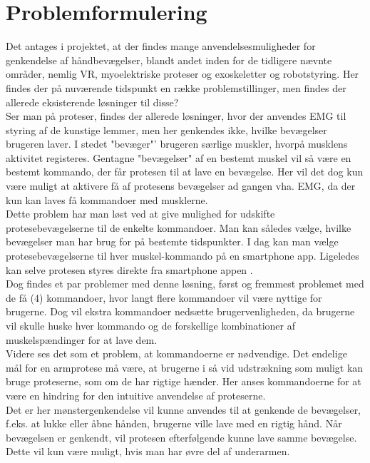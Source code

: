 \thispagestyle{fancy}
\chapter{Problemformulering}
\label{chp:problemformulering}

Det antages i projektet, at der findes mange anvendelsesmuligheder for genkendelse af håndbevægelser, blandt andet inden for de tidligere nævnte områder, nemlig VR, myoelektriske proteser og exoskeletter og robotstyring. Her findes der på nuværende tidspunkt en række problemstillinger, men findes der allerede eksisterende løsninger til disse?\\

Ser man på proteser, findes der allerede løsninger, hvor der anvendes EMG til styring af de kunstige lemmer, men her genkendes ikke, hvilke bevægelser brugeren laver. I stedet "bevæger"' brugeren særlige muskler, hvorpå musklens aktivitet registeres. Gentagne "bevægelser" af en bestemt muskel vil så være en bestemt kommando, der får protesen til at lave en bevægelse. Her vil det dog kun være muligt at aktivere få af protesens bevægelser ad gangen vha. EMG, da der kun kan laves få kommandoer med musklerne. \\

Dette problem har man løst ved at give mulighed for udskifte protesebevægelserne til de enkelte kommandoer. Man kan således vælge, hvilke bevægelser man har brug for på bestemte tidspunkter. I dag kan man vælge protesebevægelserne til hver muskel-kommando på en smartphone app. Ligeledes kan selve protesen styres direkte fra smartphone appen \citep{RefWorks:12}.\\
Dog findes et par problemer med denne løsning, først og fremmest problemet med de få (4) kommandoer, hvor langt flere kommandoer vil være nyttige for brugerne. Dog vil ekstra kommandoer nedsætte brugervenligheden, da brugerne vil skulle huske hver kommando og de forskellige kombinationer af muskelspændinger for at lave dem.\\

Videre ses det som et problem, at kommandoerne er nødvendige. Det endelige mål for en armprotese må være, at brugerne i så vid udstrækning som muligt kan bruge proteserne, som om de har rigtige hænder. Her anses kommandoerne for at være en hindring for den intuitive anvendelse af proteserne.\\

Det er her mønstergenkendelse vil kunne anvendes til at genkende de bevægelser, f.eks. at lukke eller åbne hånden, brugerne ville lave med en rigtig hånd. Når bevægelsen er genkendt, vil protesen efterfølgende kunne lave samme bevægelse. Dette vil kun være muligt, hvis man har øvre del af underarmen. \\

